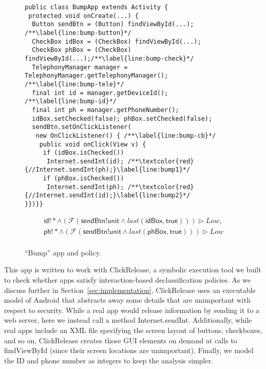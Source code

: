 \documentclass{llncs}
\newcommand{\code}[1]{\textsf{#1}} \newcommand{\bcode}[1]{\texttt{#1}}
\newcommand{\toolname}{ClickRelease\xspace}
\newcommand{\tfuture}{\mathcal{F}}
\newcommand{\tlast}[2]{\textit{last}(#1, #2)}
\begin{document}
\begin{figure}[t]
\centering
\begin{lstlisting}[name=Ex]
public class BumpApp extends Activity {
 protected void onCreate(...) {
  Button sendBtn = (Button) findViewById(...); /**\label{line:bump-button}*/
  CheckBox idBox = (CheckBox) findViewById(...);
  CheckBox phBox = (CheckBox) findViewById(...);/**\label{line:bump-check}*/
  TelephonyManager manager = TelephonyManager.getTelephonyManager(); /**\label{line:bump-tele}*/
  final int id = manager.getDeviceId(); /**\label{line:bump-id}*/
  final int ph = manager.getPhoneNumber();
  idBox.setChecked(false); phBox.setChecked(false);
  sendBtn.setOnClickListener(
   new OnClickListener() { /**\label{line:bump-cb}*/
    public void onClick(View v) {
     if (idBox.isChecked())
      Internet.sendInt(id); /**\textcolor{red}{//Internet.sendInt(ph);}\label{line:bump1}*/
     if (phBox.isChecked())
      Internet.sendInt(ph); /**\textcolor{red}{//Internet.sendInt(id);}\label{line:bump2}*/
}})}}
  \end{lstlisting}
\begin{displaymath}
  \begin{array}{cc}
      \code{id}!\ast \wedge (\tfuture ( \code{sendBtn!unit} \land
      \tlast{\code{idBox}}{\code{true}})) \rhd Low, \\

      \code{ph}!\ast \wedge (\tfuture (
      \code{sendBtn!unit} \land
      \tlast{\code{phBox}}{\code{true}})) \rhd Low \\
    \end{array}
\end{displaymath}
\caption{``Bump'' app and policy.}
\label{fig:app-bump}
\end{figure}
 
This app is written to work with \toolname{}, a symbolic execution tool we built to check
whether apps satisfy interaction-based declassification policies. As we
discuss further in Section~\ref{sec:implementation}, \toolname{} uses an
executable model of Android that abstracts away some details that are
unimportant with respect to security. While a real app would release
information by sending it to a web server, here we instead call a
method \code{Internet.sendInt}. Additionally, while real apps
include an XML file specifying the screen layout of buttons,
checkboxes, and so on, \toolname{} creates those GUI elements
on demand at calls to \code{findViewById} (since their screen locations are
unimportant). Finally, we model the ID and phone number as
integers to keep the analysis simpler.
\end{document}
